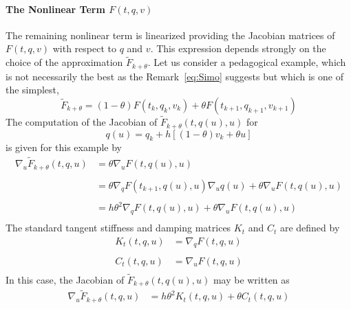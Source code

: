 

\paragraph{The Nonlinear Term $F(t,q,v)$}
The remaining nonlinear term is  linearized providing the Jacobian matrices of $F(t,q,v)$ with respect to $q$ and $v$. This expression depends strongly on the choice of the approximation $\tilde F_{k+\theta}$. Let us consider a pedagogical example, which is not necessarily the best as the Remark~\ref{eq:Simo} suggests but which is one of the simplest,
\begin{equation}
  \label{eq:NL13}
  \tilde F_{k+\theta} = (1-\theta) F(t_k,q_k,v_k) + \theta F(t_{k+1},q_{k+1},v_{k+1}) 
\end{equation}
The computation of the Jacobian of $  \tilde F_{k+\theta}(t,q(u),u)$ for $$q(u) = q_k+h[(1-\theta)v_k+\theta u]   $$ is given for this example by
\begin{equation}
  \label{eq:NL12}
  \begin{array}{ll}
    \nabla_u  \tilde F_{k+\theta}(t,q,u) &= \theta \nabla_u  F(t,q(u),u) \\ \\
    &= \theta \nabla_q F(t_{k+1},q(u)   ,u) \nabla_{u} q(u) + \theta \nabla_{u} F(t,q(u),u)    \\ \\
    &= h \theta^2 \nabla_q F(t, q(u)   ,u) + \theta \nabla_{u} F(t,q(u),u) \\   
  \end{array}
\end{equation}
The standard tangent stiffness and damping matrices $K_t$ and $C_t$ are defined by
\begin{equation}
  \label{eq:NL14}
  \begin{array}{ll}
  K_t(t,q,u) &= \nabla_q F(t, q   ,u) \\ \\
  C_t(t,q,u) &= \nabla_u F(t, q   ,u) \\
\end{array}  
\end{equation}
In this case, the  Jacobian of $  \tilde F_{k+\theta}(t,q(u),u)$ may be written as 
\begin{equation}
  \label{eq:NL15}
  \begin{array}{ll}
    \nabla_u  \tilde F_{k+\theta}(t,q,u) &=  h \theta^2  K_t(t,q,u) + \theta C_t(t, q   ,u)  \\   
  \end{array}
\end{equation}

